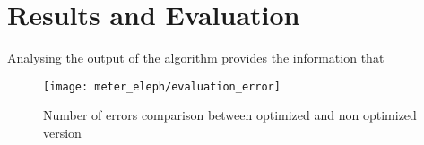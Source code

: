 \section {Results and Evaluation} \label{sec:change_result}

Analysing the output of the algorithm provides the information that 

\begin{figure} [H]
    \centering
    \texttt{[image: meter\_eleph/evaluation\_error]}
    \caption {Number of errors comparison between optimized and non optimized version}
    \label{fig:errors_comparaison}
\end{figure} 
